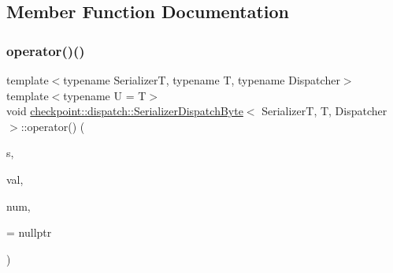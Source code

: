 \subsection{Member Function Documentation}
\mbox{\label{structcheckpoint_1_1dispatch_1_1_serializer_dispatch_byte_ab4417246d499f38e96145a6fe6a61a4d}} 
\subsubsection{\texorpdfstring{operator()()}{operator()()}\hspace{0.1cm}{\footnotesize\ttfamily [1/2]}}
{\footnotesize\ttfamily template$<$typename SerializerT, typename T, typename Dispatcher$>$ \\
template$<$typename U  = T$>$ \\
void \hyperlink{structcheckpoint_1_1dispatch_1_1_serializer_dispatch_byte}{checkpoint\+::dispatch\+::\+Serializer\+Dispatch\+Byte}$<$ SerializerT, T, Dispatcher $>$\+::operator() (\begin{DoxyParamCaption}\item[{SerializerT \&}]{s,  }\item[{T $\ast$}]{val,  }\item[{\hyperlink{namespacecheckpoint_a083f6674da3f94c2901b18c6d238217c}{Serial\+Size\+Type}}]{num,  }\item[{\hyperlink{structcheckpoint_1_1dispatch_1_1_serializer_dispatch_byte_a6de610e1888790d04dbde87b243d7c7f}{is\+Byte\+Copy\+Type}$<$ U $>$ $\ast$}]{ = {\ttfamily nullptr} }\end{DoxyParamCaption})\hspace{0.3cm}{\ttfamily [inline]}}

\mbox{\label{structcheckpoint_1_1dispatch_1_1_serializer_dispatch_byte_ac0dc38fad768cc1b4e9b45fc775b36f5}} 
